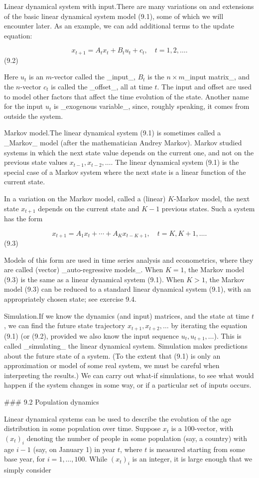 Linear dynamical system with input.There are many variations on and extensions of the basic linear dynamical system model (9.1), some of which we will encounter later. As an example, we can add additional terms to the update equation:

\[x_{t+1}=A_{t}x_{t}+B_{t}u_{t}+c_{t},\quad t=1,2,\ldots.\] (9.2)

Here \(u_{t}\) is an \(m\)-vector called the _input_, \(B_{t}\) is the \(n\times m\)_input matrix_, and the \(n\)-vector \(c_{t}\) is called the _offset_, all at time \(t\). The input and offset are used to model other factors that affect the time evolution of the state. Another name for the input \(u_{t}\) is _exogenous variable_, since, roughly speaking, it comes from outside the system.

Markov model.The linear dynamical system (9.1) is sometimes called a _Markov_ model (after the mathematician Andrey Markov). Markov studied systems in which the next state value depends on the current one, and not on the previous state values \(x_{t-1},x_{t-2},\ldots\). The linear dynamical system (9.1) is the special case of a Markov system where the next state is a linear function of the current state.

In a variation on the Markov model, called a (linear) \(K\)-Markov model, the next state \(x_{t+1}\) depends on the current state and \(K-1\) previous states. Such a system has the form

\[x_{t+1}=A_{1}x_{t}+\cdots+A_{K}x_{t-K+1},\quad t=K,K+1,\ldots.\] (9.3)

Models of this form are used in time series analysis and econometrics, where they are called (vector) _auto-regressive models_. When \(K=1\), the Markov model (9.3) is the same as a linear dynamical system (9.1). When \(K>1\), the Markov model (9.3) can be reduced to a standard linear dynamical system (9.1), with an appropriately chosen state; see exercise 9.4.

Simulation.If we know the dynamics (and input) matrices, and the state at time \(t\), we can find the future state trajectory \(x_{t+1},x_{t+2},\ldots\) by iterating the equation (9.1) (or (9.2), provided we also know the input sequence \(u_{t},u_{t+1},\ldots\)). This is called _simulating_ the linear dynamical system. Simulation makes predictions about the future state of a system. (To the extent that (9.1) is only an approximation or model of some real system, we must be careful when interpreting the results.) We can carry out what-if simulations, to see what would happen if the system changes in some way, or if a particular set of inputs occurs.

### 9.2 Population dynamics

Linear dynamical systems can be used to describe the evolution of the age distribution in some population over time. Suppose \(x_{t}\) is a 100-vector, with \((x_{t})_{i}\) denoting the number of people in some population (say, a country) with age \(i-1\) (say, on January 1) in year \(t\), where \(t\) is measured starting from some base year, for \(i=1,\ldots,100\). While \((x_{t})_{i}\) is an integer, it is large enough that we simply consider 